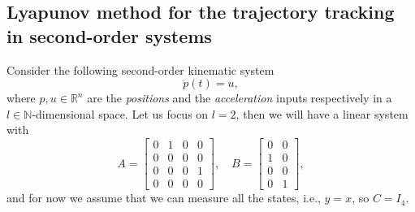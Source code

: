 \documentclass[11pt,a4paper,titlepage]{article}
\begin{document}
\subsection{Lyapunov method for the trajectory tracking in second-order systems}
Consider the following second-order kinematic system
\begin{equation}
	\ddot p(t) = u,
	\label{eq: pdyn}
\end{equation}
where $p,u\in\mathbb{R}^n$ are the \emph{positions} and the \emph{acceleration} inputs respectively in a $l\in\mathbb{N}$-dimensional space. Let us focus on $l=2$, then we will have a linear system with
\begin{equation}
	A = \begin{bmatrix}0 & 1 & 0 & 0 \\ 0 & 0 & 0 & 0 \\
		0 & 0 & 0 & 1 \\ 0 & 0 & 0 & 0 \end{bmatrix}, \quad B = \begin{bmatrix}0 & 0  \\ 1 & 0  \\ 0 & 0 \\ 0 & 1\end{bmatrix},
\end{equation}
and for now we assume that we can measure all the states, i.e., $y = x$, so $C = I_4$.
\end{document}
